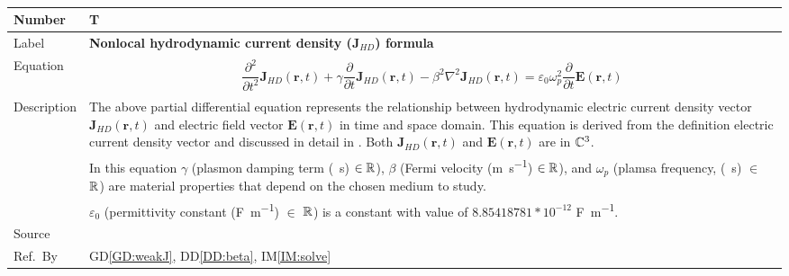 \documentclass[12pt]{article}
\newcommand{\colAwidth}{0.13\textwidth}
\newcommand{\colBwidth}{0.82\textwidth}
\newcounter{theorynum} %
\begin{document}
~\newline
\noindent
\begin{minipage}{\textwidth}
	\renewcommand*{\arraystretch}{1.5}
	\begin{tabular}{| p{\colAwidth} | p{\colBwidth}|}
		\hline
		\rowcolor[gray]{0.9}
		Number& T{theorynum}\thetheorynum \label{TM:J}\\
		\hline
		Label&\bf Nonlocal hydrodynamic current density (J$_{HD}$) formula \\
		\hline
		Equation&  
		\begin{equation}
			\label{eq:Jnonlocal}
			\begin{gathered}	
					\dfrac{\partial^{2}}{\partial t^{2}}\textbf{J}_{HD}(\textbf{r},t)	+ \gamma\dfrac{\partial}{\partial t}\textbf{J}_{HD}(\textbf{r},t) - \beta^{2}\nabla^{2}\textbf{J}_{HD}(\textbf{r},t) = \varepsilon_{0}\omega^{2}_{p}\dfrac{\partial}{\partial t} \textbf{E}(\textbf{r},t)			
		    \end{gathered}  \end{equation} \\
		
		
		\hline
		Description & 
		The above partial differential equation represents the relationship between hydrodynamic electric current density vector $\textbf{J}_{HD}(\textbf{r},t)$ and electric field vector $\textbf{E}(\textbf{r},t)$ in time and space domain. This equation is derived from the definition electric current density vector and discussed in detail in \cite{hiremath2012numerical}. Both $\textbf{J}_{HD}(\textbf{r},t)$ and $\textbf{E}(\textbf{r},t)$ are in $\Bbb C^3$.\\
		& In this equation $\gamma$ (plasmon damping term (\si{\per \second}) $\in \Bbb R$), $\beta$ (Fermi velocity (\si{\meter \per \second}) $\in \Bbb R$), and $\omega_p$ (plamsa frequency, (\si{\per \second}) $\in$ $\Bbb R$) are material properties that depend on the chosen medium to study.\\
		& $\varepsilon_0$ (permittivity constant (\si{\farad \per \meter}) $\in$ $\Bbb R$) is a constant with value of $8.85418781*10^{-12}$ \si{\farad \per \meter}.   
		\\
		\hline
		Source & 
		\cite{hiremath2012numerical} \\
		\hline
		Ref.\ By & GD\ref{GD:weakJ}, DD\ref{DD:beta}, IM\ref{IM:solve}\\
		\hline
	\end{tabular}
\end{minipage}\\
\end{document}
